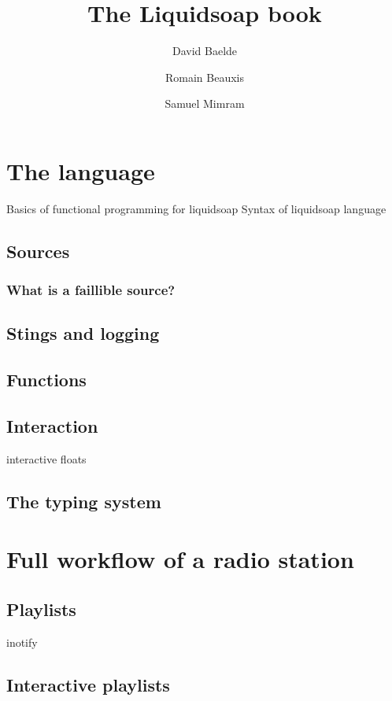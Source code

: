 \documentclass{book}
\title{The Liquidsoap book}
\author{David Baelde \and Romain Beauxis \and Samuel Mimram}
\begin{document}



\tableofcontents







\chapter{The language}
Basics of functional programming for liquidsoap
Syntax of liquidsoap language

\section{Sources}
\subsection{What is a faillible source?}

\section{Stings and logging}

\section{Functions}

\section{Interaction}
interactive floats

\section{The typing system}

\chapter{Full workflow of a radio station}
\section{Playlists}

inotify

\section{Interactive playlists}
\end{document}

